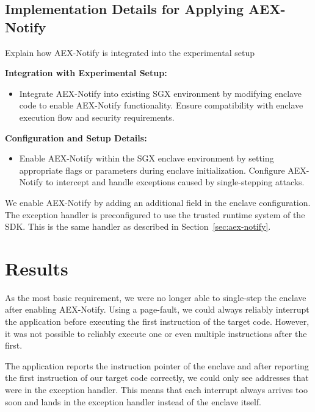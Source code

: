 \documentclass{llncs}
\begin{document}
\subsection{Implementation Details for Applying AEX-Notify}

Explain how AEX-Notify is integrated into the experimental setup

\textbf{Integration with Experimental Setup:}
\begin{itemize}
  \item
    Integrate AEX-Notify into existing SGX environment
    by modifying enclave code to enable AEX-Notify functionality.
    Ensure compatibility with enclave execution flow and security requirements.
\end{itemize}

\textbf{Configuration and Setup Details:}
\begin{itemize}
  \item Enable AEX-Notify within the SGX enclave environment
    by setting appropriate flags or parameters during enclave initialization.
    Configure AEX-Notify to intercept and handle exceptions caused by single-stepping attacks.
\end{itemize}

We enable AEX-Notify by adding an additional field in the enclave configuration.
The exception handler is preconfigured to use the trusted runtime system of the SDK.
This is the same handler as described in Section~\ref{sec:aex-notify}.

\section{Results}

As the most basic requirement,
we were no longer able to single-step the enclave after enabling AEX-Notify.
Using a page-fault, we could always reliably interrupt the application
before executing the first instruction of the target code.
However, it was not possible to reliably execute one or even multiple instructions after the first.

The application reports the instruction pointer of the enclave
and after reporting the first instruction of our target code correctly,
we could only see addresses that were in the exception handler.
This means that each interrupt always arrives too soon and
lands in the exception handler instead of the enclave itself.
\end{document}
